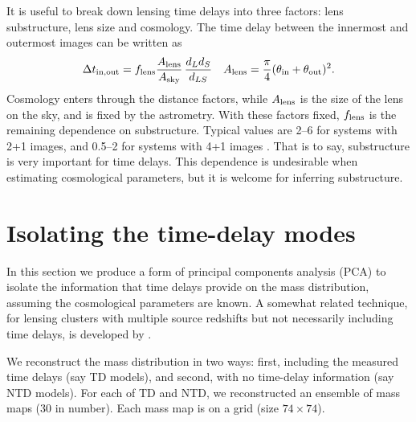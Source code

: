 \documentclass[
  11pt,
  twoside,
  openright,
  titlepage,
  headings=optiontoheadandtoc
]{scrbook}
\begin{document}
It is useful to break down lensing time delays into three factors:
lens substructure, lens size and cosmology.  The time delay between
the innermost and outermost images can be written as
\begin{equation}
   \Delta t_{\rm in,out} = f_{\rm lens} \frac{A_{\rm lens}}{A_{\rm
       sky}} \, \frac{d_Ld_S}{d_{LS}} \quad
A_{\rm lens} = \frac\pi4 (\theta_{\rm in}+\theta_{\rm out})^2 .
\end{equation}
Cosmology enters through the distance factors, while $A_{\rm lens}$ is
the size of the lens on the sky, and is fixed by the astrometry.  With
these factors fixed, $f_{\rm lens}$ is the remaining dependence on
substructure.  Typical values are 2--6 for systems with 2+1 images,
and 0.5--2 for systems with 4+1 images \citep{2006ApJ...650L..17S}.
That is to say, substructure is very important for time delays.  This
dependence is undesirable when estimating cosmological parameters, but
it is welcome for inferring substructure.

\section{Isolating the time-delay modes}\label{p4:sec:theory}

In this section we produce a form of principal components analysis
(PCA) to isolate the information that time delays provide on the mass
distribution, assuming the cosmological parameters are known. A
somewhat related technique, for lensing clusters with multiple source
redshifts but not necessarily including time delays, is developed by
\cite{2014MNRAS.437.2461L}.

We reconstruct the mass distribution in two ways: first, including the
measured time delays (say TD models), and second, with no time-delay
information (say NTD models).  For each of TD and NTD, we
reconstructed an ensemble of mass maps (30 in number).  Each mass map
is on a grid (size $74\times 74$).
\end{document}
